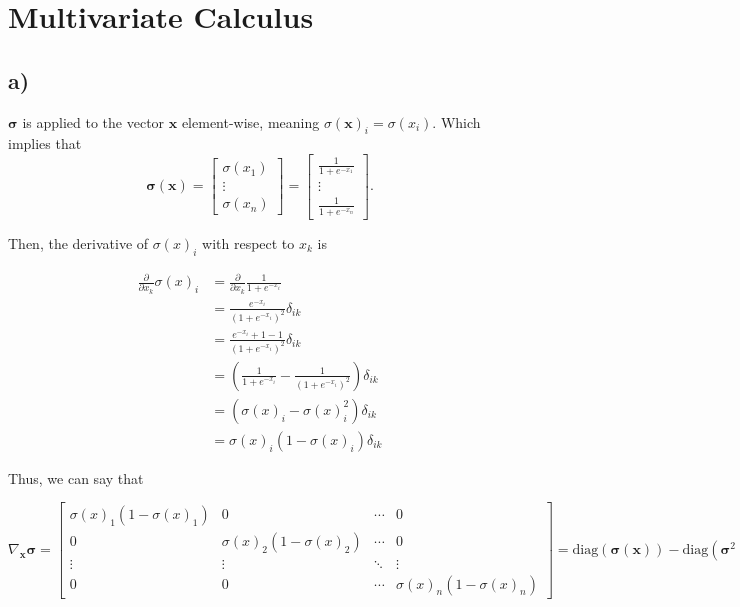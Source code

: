 \documentclass[12pt,a4paper,oneside]{paper}
\begin{document}
\pagestyle{plain}


\def\title {Homework Assignment 1}

 
\cleardoublepage
{}\selectfont
\setcounter{page}{0}
\tableofcontents
\newpage

\small

\section{Multivariate Calculus}

\subsection*{a)}

$\bm{\sigma}$ is applied to the vector $\bm{x}$ element-wise, meaning $\sigma(\bm{x})_i = \sigma(x_i)$. Which implies that
\begin{equation*}
    \bm{\sigma}(\bm{x}) = \begin{bmatrix}
    \sigma(x_1) \\
    \vdots \\
    \sigma(x_n)
    \end{bmatrix}
    = \begin{bmatrix}
    \frac{1}{1 + e^{-x_1}} \\
    \vdots \\
    \frac{1}{1 + e^{-x_n}}
    \end{bmatrix}.
\end{equation*}

Then, the derivative of $\sigma(x)_i$ with respect to $x_k$ is

\begin{align*}
    \frac{\partial}{\partial x_k} \sigma(x)_i &= \frac{\partial}{\partial x_k} \frac{1}{1 + e^{-x_i}} \\
    &= \frac{e^{-x_i}}{(1 + e^{-x_i})^2} \delta_{ik}\\
    &= \frac{e^{-x_i} + 1 - 1}{(1 + e^{-x_i})^2} \delta_{ik}\\
    &= \left(\frac{1}{1 + e^{-x_i}} - \frac{1}{(1 + e^{-x_i})^2}\right)\delta_{ik}\\
    &= \left(\sigma(x)_i - \sigma(x)_i^2\right) \delta_{ik}\\
    &= \sigma(x)_i \left(1 - \sigma(x)_i\right) \delta_{ik}
\end{align*}

Thus, we can say that

\begin{equation*}
    \nabla_{\bm{x}} \bm{\sigma} = \begin{bmatrix}
    \sigma(x)_1 \left(1 - \sigma(x)_1\right) & 0 & \cdots & 0 \\
    0 & \sigma(x)_2 \left(1 - \sigma(x)_2\right) & \cdots & 0 \\
    \vdots & \vdots & \ddots & \vdots \\
    0 & 0 & \cdots & \sigma(x)_n \left(1 - \sigma(x)_n\right)
    \end{bmatrix} = \text{diag}(\bm{\sigma}(\bm{x})) - \text{diag}(\bm{\sigma}^2(\bm{x})).
\end{equation*}
\end{document}
